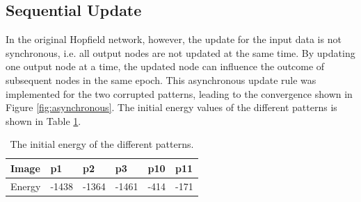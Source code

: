 \documentclass[a4paper]{article}
\begin{document}
\subsection{Sequential Update}
In the original Hopfield network, however, the update for the input data is not synchronous, i.e. all output nodes are not updated at the same time. By updating one output node at a time, the updated node can influence the outcome of subsequent nodes in the same epoch. This asynchronous update rule was implemented for the two corrupted patterns, leading to the convergence shown in Figure \ref{fig:asynchronous}. The initial energy values of the different patterns is shown in Table \ref{tab:energy}.
\begin{table}
\centering
\begin{tabular}{@{}llllll@{}}
  \toprule
    Image & p1 & p2 & p3 & p10 & p11 \\
  \midrule
    Energy & -1438 & -1364 & -1461 & -414 & -171 \\
\bottomrule
\end{tabular}
\caption{The initial energy of the different patterns.}
\label{tab:energy}
\end{table}
\end{document}
